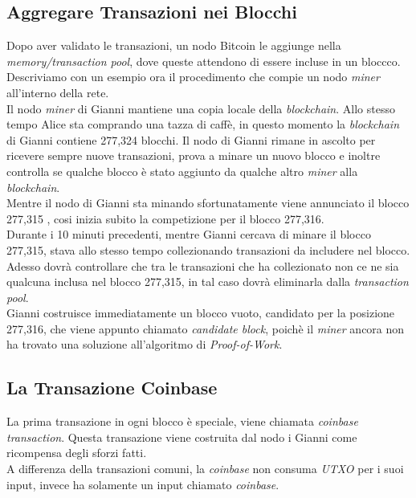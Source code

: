 \subsection{Aggregare Transazioni nei Blocchi}
Dopo aver validato le transazioni, un nodo Bitcoin le aggiunge nella \textit{memory/transaction pool}, dove queste attendono di essere incluse in un bloccco.\\
Descriviamo con un esempio ora il procedimento che compie un nodo \textit{miner} all'interno della rete.\\
Il nodo \textit{miner} di Gianni mantiene una copia locale della \textit{blockchain}. Allo stesso tempo Alice sta comprando una tazza di caff\`e, in questo momento la \textit{blockchain} di Gianni contiene 277,324 blocchi. Il nodo di Gianni rimane in ascolto per ricevere sempre nuove transazioni, prova a minare un nuovo blocco e inoltre controlla se qualche blocco \`e stato aggiunto da qualche altro \textit{miner} alla \textit{blockchain}.\\
Mentre il nodo di Gianni sta minando sfortunatamente viene annunciato il blocco 277,315 , cosi inizia subito la competizione per il blocco 277,316.\\
Durante i 10 minuti precedenti, mentre Gianni cercava di minare il blocco 277,315, stava allo stesso tempo collezionando transazioni da includere nel blocco. Adesso dovr\`a controllare che tra le transazioni che ha collezionato non ce ne sia qualcuna inclusa nel blocco 277,315, in tal caso dovr\`a eliminarla dalla \textit{transaction pool}.\\
Gianni costruisce immediatamente un blocco vuoto, candidato per la posizione 277,316, che viene appunto chiamato \textit{candidate block}, poich\`e il \textit{miner} ancora non ha trovato una soluzione all'algoritmo di \textit{Proof-of-Work}.

\subsection{La Transazione Coinbase}
La prima transazione in ogni blocco \`e speciale, viene chiamata \textit{coinbase transaction}. Questa transazione viene costruita dal nodo i Gianni come ricompensa degli sforzi fatti.\\
A differenza della transazioni comuni, la \textit{coinbase} non consuma \textit{UTXO} per i suoi input, invece ha solamente un input chiamato \textit{coinbase}.


